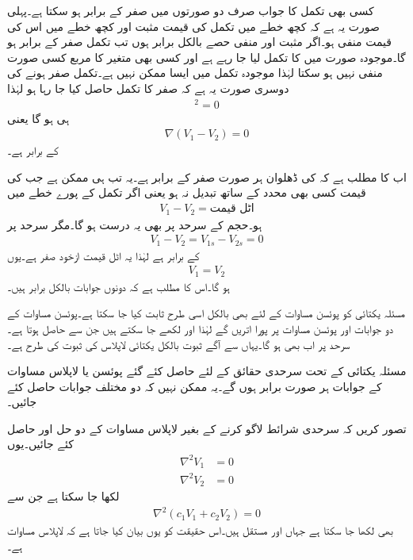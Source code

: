 کسی بھی تکمل کا جواب صرف دو صورتوں میں صفر کے برابر ہو سکتا ہے۔پہلی صورت یہ ہے کہ کچھ خطے میں تکمل کی قیمت مثبت اور کچھ خطے میں اس کی قیمت منفی ہو۔اگر مثبت اور منفی حصے بالکل برابر ہوں تب تکمل صفر کے برابر ہو گا۔موجودہ صورت میں  کا تکمل لیا جا رہے ہے اور کسی بھی متغیر کا مربع کسی صورت منفی نہیں ہو سکتا لہٰذا موجودہ تکمل میں ایسا ممکن نہیں ہے۔تکمل صفر ہونے کی دوسری صورت یہ ہے کہ صفر کا تکمل حاصل کیا جا رہا ہو لہٰذا
\begin{align*}
[\nabla(V_1-V_2)]^2 =0
\end{align*}
ہی ہو گا یعنی
\begin{align*}
\nabla (V_1-V_2)=0
\end{align*}
کے برابر ہے۔

اب  کا مطلب ہے کہ  کی ڈھلوان ہر صورت صفر کے برابر ہے۔یہ تب ہی ممکن ہے جب  کی قیمت کسی بھی محدد کے ساتھ تبدیل نہ ہو یعنی اگر تکمل کے پورے خطے میں
\begin{align*}
V_1-V_2=\textrm{اٹل قیمت}
\end{align*}
ہو۔حجم کے سرحد پر بھی یہ درست ہو گا۔مگر سرحد پر
\begin{align*}
V_1-V_2=V_{1s}-V_{2s}=0
\end{align*}
کے برابر ہے لہٰذا یہ اٹل قیمت ازخود صفر ہے۔یوں
\begin{align}
V_1=V_2
\end{align}
ہو گا۔اس کا مطلب  ہے کہ دونوں جوابات بالکل برابر ہیں۔

مسئلہ یکتائی کو پوئسن مساوات کے لئے بھی بالکل اسی طرح ثابت کیا جا سکتا ہے۔پوئسن مساوات کے دو جوابات  اور  پوئسن مساوات پر پورا اتریں گے لہٰذا  اور  لکھے جا سکتے ہیں جن سے  حاصل ہوتا ہے۔سرحد پر اب بھی  ہو گا۔یہاں سے آگے ثبوت بالکل یکتائی لاپلاس کی ثبوت کی طرح ہے۔

مسئلہ یکتائی کے تحت سرحدی حقائق کے لئے حاصل کئے  گئے پوئسن یا لاپلاس مساوات کے جوابات ہر صورت برابر ہوں گے۔یہ ممکن نہیں کہ دو مختلف جوابات حاصل کئے جائیں۔ 

تصور کریں کہ سرحدی شرائط لاگو کرنے  کے بغیر لاپلاس مساوات کے دو حل  اور  حاصل کئے جائیں۔یوں
\begin{align*}
\nabla^2 V_1&=0\\
\nabla^2 V_2&=0
\end{align*}
لکھا جا سکتا ہے جن سے
\begin{align*}
\nabla^2 (c_1 V_1 + c_2 V_2)=0 
\end{align*}
بھی لکھا جا سکتا ہے جہاں  اور  مستقل ہیں۔اس حقیقت کو یوں بیان کیا جاتا ہے کہ لاپلاس مساوات  ہے۔


